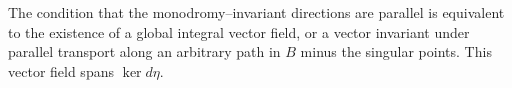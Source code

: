 \documentclass[12pt]{amsart}
\begin{document}
\begin{remark}
  The condition that the monodromy--invariant directions are parallel
  is equivalent to the existence of a global integral vector field, or
  a vector invariant under parallel transport along an arbitrary path
  in $B$ minus the singular points. This vector field spans $\ker
  d\eta$.
\end{remark}



\end{document}
